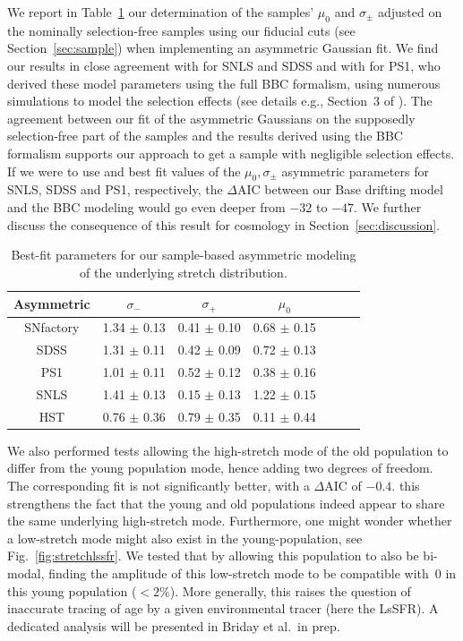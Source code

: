 \documentclass[]{aa}
\newcommand{\nn}[1]{\textcolor[rgb]{0.25, 0.50, 0}{#1}}
\begin{document}
We report in Table~\ref{tab:bbc} \nn{our determination of} the samples' $\mu_0$
and $\sigma_{\pm}$ adjusted on the nominally selection-free samples using our
fiducial cuts (see Section~\ref{sec:sample}) \nn{when implementing an asymmetric
Gaussian fit}. We find our results in close agreement with \cite{scolnic2016}
for SNLS and SDSS and with \cite{scolnic2018a} for PS1, who derived these model
parameters using the full BBC formalism, using numerous simulations to model the
selection effects (see details e.g., Section~3 of \citealt{kessler2017}). The
agreement between our fit of the asymmetric Gaussians on the supposedly
selection-free part of the samples and the results derived using the BBC
formalism supports our approach to get a sample with negligible selection
effects. If we were to use \cite{scolnic2016} and \cite{scolnic2018a} best fit
values of the $\mu_0, \sigma_{\pm}$ asymmetric parameters for SNLS, SDSS and
PS1, respectively, the $\Delta$AIC between our Base drifting model and the BBC
modeling would go even deeper from $-32$ to $-47$. We further discuss the
consequence of this result for cosmology in Section~\ref{sec:discussion}.
    
\begin{table}
    \centering
    \caption{Best-fit parameters for our sample-based asymmetric modeling of the
    underlying stretch distribution.}
    \label{tab:bbc}
    \begin{tabular}{ccccccc}
    \hline\hline
    Asymmetric & $\sigma_{-}$ & $\sigma_{+}$ & $\mu_0$ \\
    \hline
    SNfactory & 1.34 $\pm$ 0.13 & 0.41 $\pm$ 0.10 & 0.68 $\pm$ 0.15 \\
    SDSS & 1.31 $\pm$ 0.11 & 0.42 $\pm$ 0.09 & 0.72 $\pm$ 0.13 \\
    PS1 & 1.01 $\pm$ 0.11 & 0.52 $\pm$ 0.12 & 0.38 $\pm$ 0.16 \\
    SNLS & 1.41 $\pm$ 0.13 & 0.15 $\pm$ 0.13 & 1.22 $\pm$ 0.15 \\
    HST & 0.76 $\pm$ 0.36 & 0.79 $\pm$ 0.35 & 0.11 $\pm$ 0.44 \\
    \hline
    \end{tabular}
\end{table}
    
We also performed tests allowing the high-stretch mode of the old population to
differ from the young population mode, hence adding two degrees of freedom. The
corresponding fit is not significantly better, with a $\Delta$AIC of $-0.4$.
this strengthens the fact that the young and old populations indeed appear to
share the same underlying high-stretch mode. Furthermore, one might wonder
whether a low-stretch mode might also exist in the young-population, see
Fig.~\ref{fig:stretchlssfr}. We tested that by allowing this population to also
be bi-modal, finding the amplitude of this low-stretch mode to be compatible
with~0 in this young population ($<2\%$). More generally, this raises the
question of inaccurate tracing of age by a given environmental tracer (here the
LsSFR). A dedicated analysis will be presented in Briday et al.\ in prep.
\end{document}
